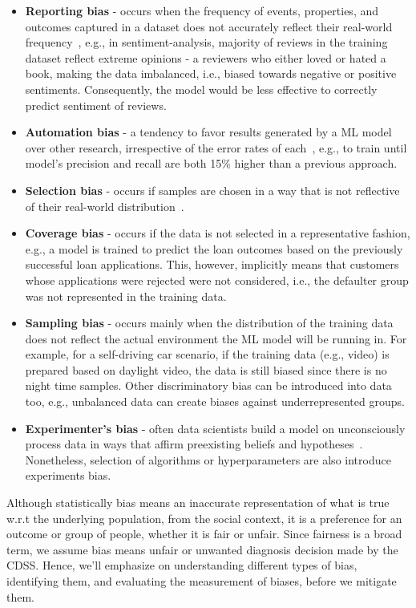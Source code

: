 \begin{itemize}[noitemsep]
    \item \textbf{Reporting bias} - occurs when the frequency of events, properties, and outcomes captured in a dataset does not accurately reflect their real-world frequency~\cite{GoogleBiasList}, e.g., in sentiment-analysis, majority of reviews in the training dataset reflect extreme opinions - a reviewers who either loved or hated a book, making the data imbalanced, i.e., biased towards negative or positive sentiments. Consequently, the model would be less effective to correctly predict sentiment of reviews. 
    \item \textbf{Automation bias} - a tendency to favor results generated by a ML model over other research, irrespective of the error rates of each~\cite{GoogleBiasList}, e.g., to train until model's precision and recall are both 15\% higher than a previous approach.
    \item \textbf{Selection bias} - occurs if samples are chosen in a way that is not reflective of their real-world distribution~\cite{GoogleBiasList}. 
    \item \textbf{Coverage bias} - occurs if the data is not selected in a representative fashion\cite{GoogleBiasList}, e.g., a model is trained to predict the loan  outcomes based on the previously successful loan applications. This, however, implicitly means that customers whose applications were rejected were not considered, i.e., the defaulter group was not represented in the training data.
    \item \textbf{Sampling bias} - occurs mainly when the distribution of the training data does not reflect the actual environment the ML model will be running in. For example, for a self-driving car scenario, if the training data (e.g., video) is prepared based on daylight video, the data is still biased since there is no night time samples. Other discriminatory bias can be introduced into data too, e.g., unbalanced data can create biases against underrepresented groups. 
    \item \textbf{Experimenter's bias} - often data scientists build a model on unconsciously process data in ways that affirm preexisting beliefs and hypotheses~\cite{GoogleBiasList}. Nonetheless, selection of algorithms or hyperparameters are also introduce experiments bias. 
\end{itemize}

\hspace*{3.5mm} Although statistically bias means an inaccurate representation of what is true w.r.t the underlying population, from the social context, it is a preference for an outcome or group of people, whether it is fair or unfair. Since fairness is a broad term, we assume bias means unfair or unwanted diagnosis decision made by the CDSS. Hence, we'll emphasize on understanding different types of bias, identifying them, and evaluating the measurement of biases, before we mitigate them. 

